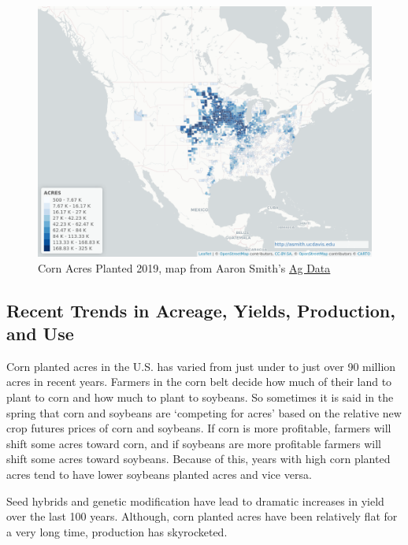 \documentclass[
  letterpaper,
  DIV=11,
  numbers=noendperiod]{scrreprt}
\begin{document}
\begin{figure}

{\centering \includegraphics{assets/map_CORN_AREA PLANTED.png}

}

\caption{Corn Acres Planted 2019, map from Aaron Smith's
\href{https://asmith.ucdavis.edu/data/us-crops}{Ag Data}}

\end{figure}

\hypertarget{recent-trends-in-acreage-yields-production-and-use}{%
\subsection{Recent Trends in Acreage, Yields, Production, and
Use}\label{recent-trends-in-acreage-yields-production-and-use}}

Corn planted acres in the U.S. has varied from just under to just over
90 million acres in recent years. Farmers in the corn belt decide how
much of their land to plant to corn and how much to plant to soybeans.
So sometimes it is said in the spring that corn and soybeans are
`competing for acres' based on the relative new crop futures prices of
corn and soybeans. If corn is more profitable, farmers will shift some
acres toward corn, and if soybeans are more profitable farmers will
shift some acres toward soybeans. Because of this, years with high corn
planted acres tend to have lower soybeans planted acres and vice versa.

Seed hybrids and genetic modification have lead to dramatic increases in
yield over the last 100 years. Although, corn planted acres have been
relatively flat for a very long time, production has skyrocketed.
\end{document}
